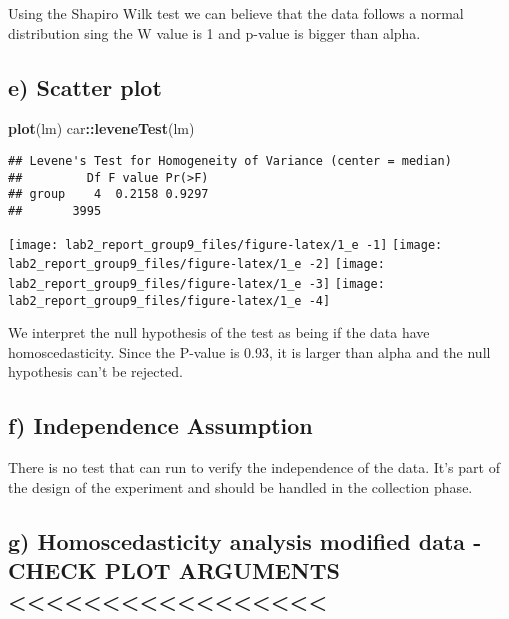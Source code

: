 \documentclass[
]{article}
\newenvironment{Shaded}{\begin{snugshade}}{\end{snugshade}}
\newcommand{\KeywordTok}[1]{\textcolor[rgb]{0.13,0.29,0.53}{\textbf{#1}}}
\newcommand{\NormalTok}[1]{#1}
\newcommand{\OperatorTok}[1]{\textcolor[rgb]{0.81,0.36,0.00}{\textbf{#1}}}
\begin{document}
Using the Shapiro Wilk test we can believe that the data follows a
normal distribution sing the W value is 1 and p-value is bigger than
alpha.

\hypertarget{e-scatter-plot}{%
\subsection{e) Scatter plot}\label{e-scatter-plot}}

\begin{Shaded}
\begin{Highlighting}[]
\KeywordTok{plot}\NormalTok{(lm)}
\NormalTok{car}\OperatorTok{::}\KeywordTok{leveneTest}\NormalTok{(lm)}
\end{Highlighting}
\end{Shaded}

\begin{verbatim}
## Levene's Test for Homogeneity of Variance (center = median)
##         Df F value Pr(>F)
## group    4  0.2158 0.9297
##       3995
\end{verbatim}

\texttt{[image: lab2\_report\_group9\_files/figure-latex/1\_e -1]}
\texttt{[image: lab2\_report\_group9\_files/figure-latex/1\_e -2]}
\texttt{[image: lab2\_report\_group9\_files/figure-latex/1\_e -3]}
\texttt{[image: lab2\_report\_group9\_files/figure-latex/1\_e -4]}

We interpret the null hypothesis of the test as being if the data have
homoscedasticity. Since the P-value is 0.93, it is larger than alpha and
the null hypothesis can't be rejected.

\hypertarget{f-independence-assumption}{%
\subsection{f) Independence
Assumption}\label{f-independence-assumption}}

There is no test that can run to verify the independence of the data.
It's part of the design of the experiment and should be handled in the
collection phase.

\hypertarget{g-homoscedasticity-analysis-modified-data---check-plot-arguments}{%
\subsection{g) Homoscedasticity analysis modified data - CHECK PLOT
ARGUMENTS
\textless\textless\textless\textless\textless\textless\textless\textless\textless\textless\textless\textless\textless\textless\textless\textless\textless{}}\label{g-homoscedasticity-analysis-modified-data---check-plot-arguments}}
\end{document}

